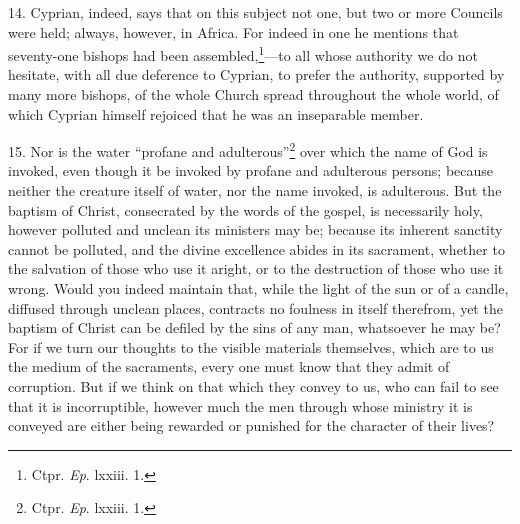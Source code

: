 14. Cyprian, indeed, says that on this subject not one, but two or more Councils were held; always, however, in Africa. For indeed in one he mentions that seventy-one bishops had been assembled,\footnote{\par  Ctpr. \emph{Ep}. lxxiii. 1.}—to all whose authority we do not hesitate, with all due deference to Cyprian, to prefer the authority, supported by many more bishops, of the whole Church spread throughout the whole world, of which Cyprian himself rejoiced that he was an inseparable member.

15. Nor is the water ``profane and adulterous''\footnote{\par  Ctpr. \emph{Ep}. lxxiii. 1.} over which the name of God is invoked, even though it be invoked by profane and adulterous persons; because neither the creature itself of water, nor the name invoked, is adulterous. But the baptism of Christ, consecrated by the words of the gospel, is necessarily holy, however polluted and unclean its ministers may be; because its inherent sanctity cannot be polluted, and the divine excellence abides in its sacrament, whether to the salvation of those who use it aright, or to the destruction of those who use it wrong. Would you indeed maintain that, while the light of the sun or of a candle, diffused through unclean places, contracts no foulness in itself therefrom, yet the baptism of Christ can be defiled by the sins of any man, whatsoever he may be? For if we turn our thoughts to the visible materials themselves, which are to us the medium of the sacraments, every one must know that they admit of corruption. But if we think on that which they convey to us, who can fail to see that it is incorruptible, however much the men through whose ministry it is conveyed are either being rewarded or punished for the character of their lives?


